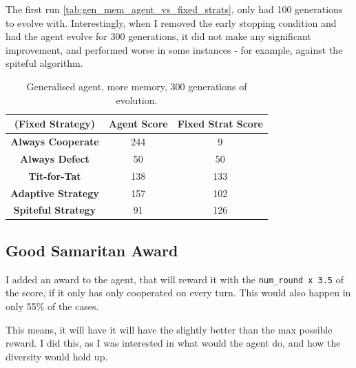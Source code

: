 \documentclass[11pt]{scrartcl} %
\begin{document}
\vspace{12pt} %
The first run \ref{tab:gen_mem_agent_vs_fixed_strats}, only had 100 generations to evolve with. 
Interestingly, when I removed the early stopping condition and had the agent evolve for 300 generations, 
it did not make any significant improvement, and performed worse in some instances - for example, against the spiteful algorithm.
\begin{table}[H]
    \centering
    \begin{tabular}{|c|c|c|}
        \hline
		\textbf{(Fixed Strategy)} & \textbf{Agent Score} & \textbf{Fixed Strat Score} \\ \hline
        \textbf{Always Cooperate} & 244 & 9\\ \hline
        \textbf{Always Defect} & 50 & 50 \\ \hline
        \textbf{Tit-for-Tat} & 138 & 133 \\ \hline
        \textbf{Adaptive Strategy} & 157 & 102 \\ \hline
        \textbf{Spiteful Strategy} & 91 & 126 \\ \hline
    \end{tabular}
    \caption{Generalised agent, more memory, 300 generations of evolution.}
    \label{tab:300_gen_mem_agent_vs_fixed_strats}
\end{table}

\subsection{Good Samaritan Award}
I added an award to the agent, that will reward it with the \texttt{num\_round x 3.5} of the score, if it only has only cooperated on every turn.
This would also happen in only 55\% of the cases.

This means, it will have it will have the slightly better than the max possible reward.
I did this, as I was interested in what would the agent do, and how the diversity would hold up.
\end{document}
